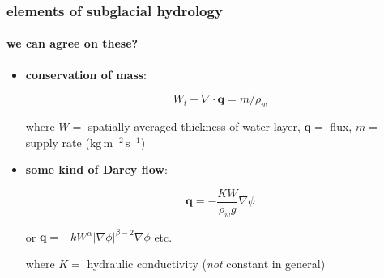 \documentclass[hide notes,intlimits]{beamer}
\begin{document}
\begin{frame}
  \frametitle{elements of subglacial hydrology}
  \framesubtitle{we can agree on these?}

\newcommand{\bq}{\mathbf{q}}

  \begin{itemize}
    \item \textbf{conservation of mass}:
    
    $$W_t + \nabla \cdot \bq = m / \rho_w$$

where $W=$ spatially-averaged thickness of water layer, $\bq=$ flux, $m=$ supply rate ($\text{kg}\,\text{m}^{-2}\,\text{s}^{-1}$)



    \item \textbf{some kind of Darcy flow}:
    
    $$\bq = - \frac{K W}{\rho_w g} \nabla \phi$$
    
    \scriptsize or \quad $\bq = - k W^\alpha |\nabla \phi|^{\beta - 2} \nabla \phi$ \quad etc.
    
\normalsize where $K=$ hydraulic conductivity (\emph{not} constant in general)
  \end{itemize}

\end{frame}
\end{document}

